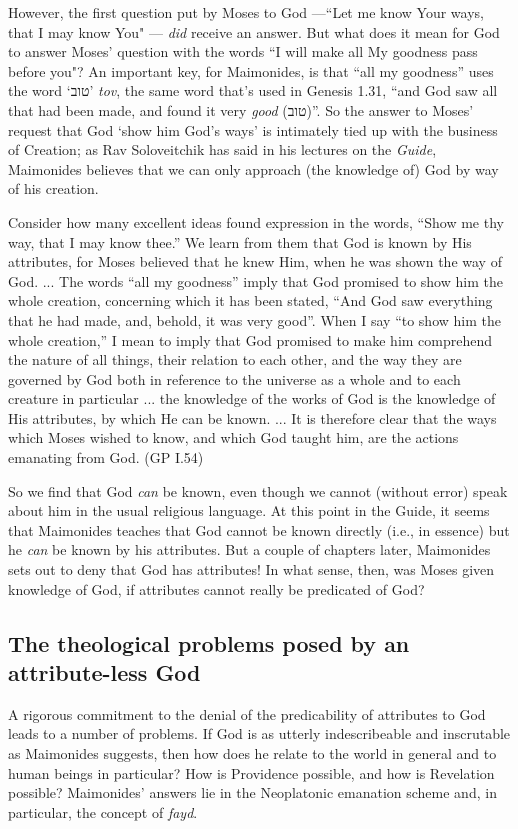 \documentclass[12pt]{article}
\begin{document}
However, the first question put by Moses to God ---``Let me know Your ways, that I may know You" --- \emph{did} receive an answer. But what does it mean for God to answer Moses' question with the words ``I will make all My goodness pass before you"? An important key, for Maimonides, is that ``all my goodness'' uses the word `{\nyfont טוב}' \textit{tov}, the same word that's used in Genesis 1.31, ``and God saw all that had been made, and found it very \emph{good} ({\nyfont טוב})''. So the answer to Moses' request that God `show him God's ways' is intimately tied up with the business of Creation; as Rav Soloveitchik has said in his lectures on the \emph{Guide}, Maimonides believes that we can only approach (the knowledge of) God by way of his creation.

\begin{displayquote}
Consider how many excellent ideas found expression in the words, “Show me thy way, that I may know thee.” We learn from them that God is known by His attributes, for Moses believed that he knew Him, when he was shown the way of God. ...
The words “all my goodness” imply that God promised to show him the whole creation, concerning which it has been stated, “And God saw everything that he had made, and, behold, it was very good”. When I say “to show him the whole creation,” I mean to imply that God promised to make him comprehend the nature of all things, their relation to each other, and the way they are governed by God both in reference to the universe as a whole and to each creature in particular ... the knowledge of the works of God is the knowledge of His attributes, by which He can be known. ... It is therefore clear that the ways which Moses wished to know, and which God taught him, are the actions emanating from God. \hfill (GP I.54)
\end{displayquote}
So we find that God \emph{can} be known, even though we cannot (without error) speak about him in the usual religious language. At this point in the Guide, it seems that Maimonides teaches that God cannot be known directly (i.e., in essence) but he \emph{can} be known by his attributes. But a couple of chapters later, Maimonides sets out to deny that God has attributes! In what sense, then, was Moses given knowledge of God, if attributes cannot really be predicated of God?


\subsection*{The theological problems posed by an attribute-less God}
A rigorous commitment to the denial of the predicability of attributes to God leads to a number of problems. If God is as utterly indescribeable and inscrutable as Maimonides suggests, then how does he relate to the world in general and to human beings in particular? How is Providence possible, and how is Revelation possible? Maimonides' answers lie in the Neoplatonic emanation scheme and, in particular, the concept of \textit{fayd}.

\vfill
\printbibliography
\end{document}
